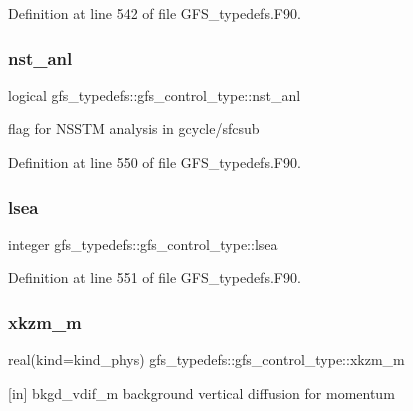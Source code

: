 Definition at line 542 of file G\+F\+S\+\_\+typedefs.\+F90.

\mbox{\label{structgfs__typedefs_1_1gfs__control__type_ad42a9d02a36a989583023eb43b3f535d}} 
\subsubsection{nst\+\_\+anl}
{\footnotesize\ttfamily logical gfs\+\_\+typedefs\+::gfs\+\_\+control\+\_\+type\+::nst\+\_\+anl}



flag for N\+S\+S\+TM analysis in gcycle/sfcsub 



Definition at line 550 of file G\+F\+S\+\_\+typedefs.\+F90.

\mbox{\label{structgfs__typedefs_1_1gfs__control__type_a45758e4d986a80ec887d3608f6041f1c}} 
\subsubsection{lsea}
{\footnotesize\ttfamily integer gfs\+\_\+typedefs\+::gfs\+\_\+control\+\_\+type\+::lsea}



Definition at line 551 of file G\+F\+S\+\_\+typedefs.\+F90.

\mbox{\label{structgfs__typedefs_1_1gfs__control__type_a228f7f1543def33e43736ec624a66dac}} 
\subsubsection{xkzm\+\_\+m}
{\footnotesize\ttfamily real(kind=kind\+\_\+phys) gfs\+\_\+typedefs\+::gfs\+\_\+control\+\_\+type\+::xkzm\+\_\+m}



[in] bkgd\+\_\+vdif\+\_\+m background vertical diffusion for momentum 




